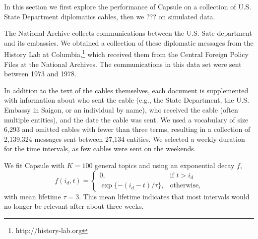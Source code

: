 




\PP In this section we first explore the performance of Capsule on a collection of U.S. State Department diplomatics cables, then we ??? on simulated data.

The National Archive collects communications between the U.S. Sate department and its embassies.  We obtained a collection of these diplomatic messages from the History Lab at Columbia,\footnote{http://history-lab.org} which received them from the Central Foreign Policy Files at the National Archives.  The communications in this data set were sent between 1973 and 1978.

In addition to the text of the cables themselves, each document is supplemented with information about who sent the cable (e.g., the State Department, the U.S. Embassy in Saigon, or an individual by name), who received the cable (often multiple entities), and the date the cable was sent.  We used a vocabulary of size 6,293 and omitted cables with fewer than three terms, resulting in a collection of 2,139,324 messages sent between 27,134 entities.  We selected a weekly duration for the time intervals, as few cables were sent on the weekends.

We fit Capsule with $K=100$ general topics and using an exponential decay $f$,
\begin{equation}
f(i_d, t) = 
\begin{cases}
    0,			& \text{if } t > i_d\\
    \exp\{-(i_d - t) / \tau\},          & \text{otherwise,}
\end{cases}
\end{equation}
with mean lifetime $\tau=3$.  This mean lifetime indicates that most intervals would no longer be relevant after about three weeks.

